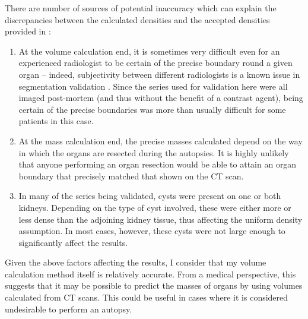 There are number of sources of potential inaccuracy which can explain the discrepancies between the calculated densities and the accepted densities provided in \cite{woodard86}:
%
\begin{enumerate}

\item At the volume calculation end, it is sometimes very difficult even for an experienced radiologist to be certain of the precise boundary round a given organ -- indeed, subjectivity between different radiologists is a known issue in segmentation validation \cite{?}. Since the series used for validation here were all imaged post-mortem (and thus without the benefit of a contrast agent), being certain of the precise boundaries was more than usually difficult for some patients in this case.

\item At the mass calculation end, the precise masses calculated depend on the way in which the organs are resected during the autopsies. It is highly unlikely that anyone performing an organ resection would be able to attain an organ boundary that precisely matched that shown on the CT scan.


\item In many of the series being validated, cysts were present on one or both kidneys. Depending on the type of cyst involved, these were either more or less dense than the adjoining kidney tissue, thus affecting the uniform density assumption. In most cases, however, these cysts were not large enough to significantly affect the results.

\end{enumerate}
%
Given the above factors affecting the results, I consider that my volume calculation method itself is relatively accurate. From a medical perspective, this suggests that it may be possible to predict the masses of organs by using volumes calculated from CT scans. This could be useful in cases where it is considered undesirable to perform an autopsy.

